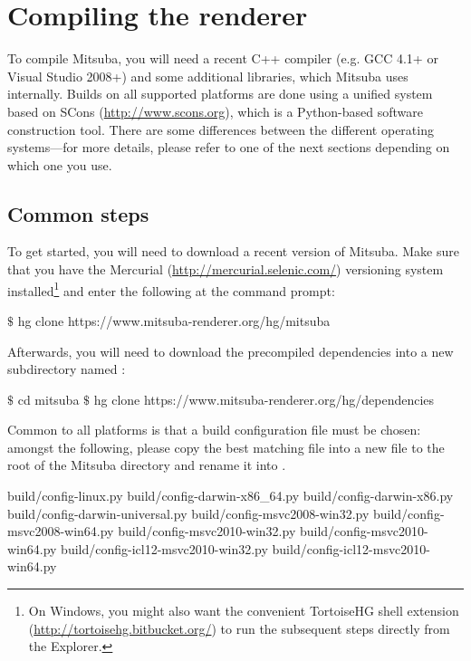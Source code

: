 \section{Compiling the renderer}
\label{sec:compiling}
To compile Mitsuba, you will need a recent C++ compiler (e.g. GCC 4.1+ or 
Visual Studio 2008+) and some additional libraries, which Mitsuba uses internally. 
Builds on all supported platforms are done using a unified system
based on SCons (\url{http://www.scons.org}), which is a Python-based 
software construction tool. There are some differences between the different operating systems---for
more details, please refer to one of the next sections depending on which one you use.

\subsection{Common steps}
To get started, you will need to download a recent version of Mitsuba. Make sure that you have the Mercurial (\url{http://mercurial.selenic.com/}) versioning system installed\footnote{On Windows, you might also want the convenient TortoiseHG shell extension (\url{http://tortoisehg.bitbucket.org/}) to run the subsequent steps directly from the Explorer.} and enter the following at the command prompt:
\begin{shell}
$\texttt{\$}$ hg clone https://www.mitsuba-renderer.org/hg/mitsuba
\end{shell}
Afterwards, you will need to download the precompiled dependencies into a new
subdirectory named :
\begin{shell}
$\texttt{\$}$ cd mitsuba
$\texttt{\$}$ hg clone https://www.mitsuba-renderer.org/hg/dependencies
\end{shell}
Common to all platforms is that a build configuration file must be chosen: amongst the
following, please copy the best matching file into a new file to the root of the Mitsuba
directory and rename it into .
\begin{shell}
build/config-linux.py  
build/config-darwin-x86_64.py  
build/config-darwin-x86.py  
build/config-darwin-universal.py  
build/config-msvc2008-win32.py  
build/config-msvc2008-win64.py
build/config-msvc2010-win32.py  
build/config-msvc2010-win64.py
build/config-icl12-msvc2010-win32.py
build/config-icl12-msvc2010-win64.py
\end{shell}

